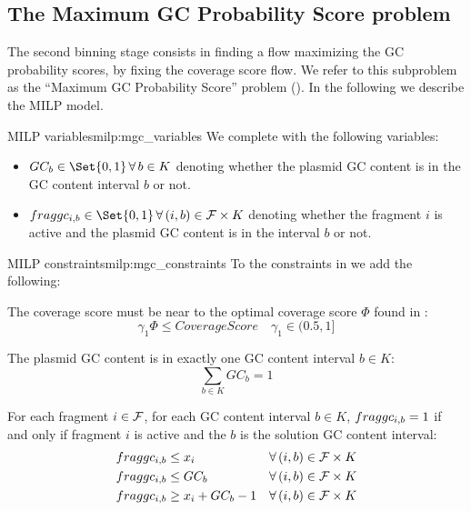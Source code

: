\subsection{The Maximum GC Probability Score problem \MGC{}}\label{meth:max_gc_score}

The second binning stage consists in finding a flow maximizing the GC probability scores, by fixing the coverage score flow.
We refer to this subproblem as the \enquote{Maximum GC Probability Score} problem (\MGC{}).
In the following we describe the MILP model.

\begin{definition}{\MGC{} MILP variables}{milp:mgc_variables}
    We complete  with the following variables:
    \begin{itemize}
        \item \(GC_b \in \Set{0, 1} \, \forall b \in K\) denoting whether the plasmid GC content is in the GC content interval \(b\) or not.
        \item \(\fraggc{i}{b} \in \Set{0, 1} \, \forall (i, b) \in \Fragments{} \times K\) denoting whether the fragment \(i\) is active and the plasmid GC content is in the interval \(b\) or not.
    \end{itemize}
\end{definition}


\begin{definition}{\MGC{} MILP constraints}{milp:mgc_constraints}
    To the constraints in  we add the following:

    The coverage score must be near to the optimal coverage score \(\Phi\) found in \MCF{}:
    \begin{equation}
        \gamma_1 \Phi \leq  CoverageScore \quad \gamma_1 \in (0.5, 1]
    \end{equation}

    The plasmid GC content is in exactly one GC content interval \(b \in K\):
    \begin{equation}
        \sum_{b \in K} GC_b = 1 
    \end{equation}

    For each fragment \(i \in \mathcal{F}{}\), for each GC content interval \(b \in K\), \(fraggc_{i,b} = 1\) if and only if fragment \(i\) is active and the \(b\) is the solution GC content interval:
    \begin{align}
        \fraggc{i}{b} & \leq x_i & \forall (i, b) \in \Fragments{} \times K \\
        \fraggc{i}{b} & \leq GC_b & \forall (i, b) \in \Fragments{} \times K \\
        \fraggc{i}{b} & \geq x_i + GC_b - 1 & \forall (i, b) \in \Fragments{} \times K
    \end{align}
\end{definition}

